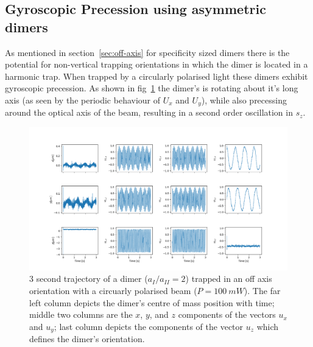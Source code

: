 \subsection{Gyroscopic Precession using asymmetric dimers}
As mentioned in section~\ref{sec:off-axis} for specificity 
sized dimers there is the potential for non-vertical trapping 
orientations in which the dimer is located in a harmonic 
trap. When trapped by a circularly polarised light these 
dimers exhibit gyroscopic precession. As shown in fig~\ref{fig:gyro} 
the dimer's is rotating about it's long axis (as seen by 
the periodic behaviour of $U_x$ and $U_y$), while also precessing 
around the optical axis of the beam, resulting in a second 
order oscillation in $s_z$.
\begin{figure}[h]
	\centering
	\includegraphics[width=\linewidth]{gyroscopic_precession.png}
	\caption{3 second trajectory of a dimer ($a_{I}/a_{II}=2$) trapped in an 
		off axis orientation with a circuarly polarised beam ($P= 100\ mW$). 
		The far left column depicts the dimer's centre of mass position with 
		time; middle two columns are the $x$, $y$, and $z$ components of the 
		vectors $u_x$ and $u_y$; last column depicts the components of the 
		vector $u_z$ which defines the dimer's orientation.}
	\label{fig:gyro}
\end{figure}

